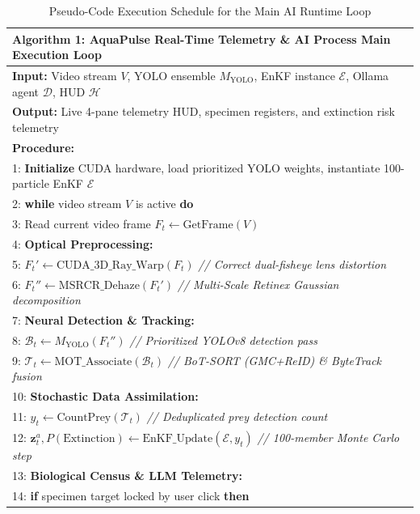 \documentclass[11pt,a4paper]{article}
\begin{document}
\begin{table}[htbp]
\caption{Pseudo-Code Execution Schedule for the Main AI Runtime Loop}
\label{tab:pseudocode_main}
\centering
\small
\begin{tabular}{p{15cm}}
\toprule
\textbf{Algorithm 1: AquaPulse Real-Time Telemetry \& AI Process Main Execution Loop} \\
\midrule
\textbf{Input:} Video stream $V$, YOLO ensemble $M_{\text{YOLO}}$, EnKF instance $\mathcal{E}$, Ollama agent $\mathcal{D}$, HUD $\mathcal{H}$ \\
\textbf{Output:} Live 4-pane telemetry HUD, specimen registers, and extinction risk telemetry \\
\textbf{Procedure:} \\
1: \textbf{Initialize} CUDA hardware, load prioritized YOLO weights, instantiate 100-particle EnKF $\mathcal{E}$ \\
2: \textbf{while} video stream $V$ is active \textbf{do} \\
3: \quad Read current video frame $F_t \leftarrow \text{GetFrame}(V)$ \\
4: \quad \textbf{Optical Preprocessing:} \\
5: \qquad $F_t' \leftarrow \text{CUDA\_3D\_Ray\_Warp}(F_t)$ \quad \textit{// Correct dual-fisheye lens distortion} \\
6: \qquad $F_t'' \leftarrow \text{MSRCR\_Dehaze}(F_t')$ \quad \textit{// Multi-Scale Retinex Gaussian decomposition} \\
7: \quad \textbf{Neural Detection \& Tracking:} \\
8: \qquad $\mathcal{B}_t \leftarrow M_{\text{YOLO}}(F_t'')$ \quad \textit{// Prioritized YOLOv8 detection pass} \\
9: \qquad $\mathcal{T}_t \leftarrow \text{MOT\_Associate}(\mathcal{B}_t)$ \quad \textit{// BoT-SORT (GMC+ReID) \& ByteTrack fusion} \\
10: \quad \textbf{Stochastic Data Assimilation:} \\
11: \qquad $y_t \leftarrow \text{CountPrey}(\mathcal{T}_t)$ \quad \textit{// Deduplicated prey detection count} \\
12: \qquad $\mathbf{z}_t^a, P(\text{Extinction}) \leftarrow \text{EnKF\_Update}(\mathcal{E}, y_t)$ \quad \textit{// 100-member Monte Carlo step} \\
13: \quad \textbf{Biological Census \& LLM Telemetry:} \\
14: \qquad \textbf{if} specimen target locked by user click \textbf{then} \\

\end{tabular}
\end{table}
\end{document}

